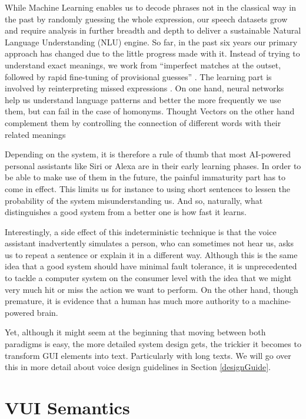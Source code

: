 While Machine Learning enables us to decode phrases not in the classical way in the past by randomly guessing the whole expression, our speech datasets grow and require analysis in further breadth and depth to deliver a sustainable Natural Language Understanding (NLU) engine.
So far, in the past six years our primary approach has changed due to the little progress made with it. Instead of trying to understand exact meanings, we work from
``imperfect matches at the outset, followed by rapid fine-tuning of provisional guesses'' \cite{mit:Alexa}. The learning part is involved by reinterpreting missed expressions \cite{aws:lex_webinar}. 
On one hand, neural networks help us understand language patterns and better the more frequently we use them, but can fail in the case of homonyms. \cite{mit:AILang} Thought Vectors on the other hand complement them by controlling the connection of different words with their related meanings %

Depending on the system, it is therefore a rule of thumb that most AI-powered personal assistants like Siri or Alexa are in their early learning phases. In order to be able to make use of them in the future, the painful immaturity part has to come in effect. This limits us for instance to using short sentences to lessen the probability of the system misunderstanding us. And so, naturally, what distinguishes a good system from a better one is how fast it learns.


Interestingly, a side effect of this indeterministic technique is that the voice assistant inadvertently simulates a person, who can sometimes not hear us, asks us to repeat a sentence or explain it in a different way. Although this is the same idea that a good system should have minimal fault tolerance, it is unprecedented to tackle a computer system on the consumer level with the idea that we might very much hit or miss the action we want to perform. On the other hand, though premature, it is evidence that a human has much more authority to a machine-powered brain.


Yet, although it might seem at the beginning that moving between both paradigms is easy, the more detailed system design gets, the trickier it becomes to transform GUI elements into text. Particularly with long texts. We will go over this in more detail about voice design guidelines in Section \ref{designGuide}.

\section{VUI Semantics}

